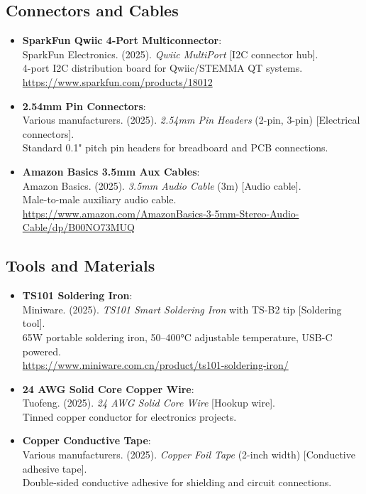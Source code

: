 \subsection*{Connectors and Cables}

\begin{itemize}[topsep=0pt, partopsep=0pt, parsep=0pt, itemsep=6pt]
	\item \textbf{SparkFun Qwiic 4-Port Multiconnector}: \\ 
	SparkFun Electronics. (2025). \textit{Qwiic MultiPort} [I2C connector hub].\\ 
	4-port I2C distribution board for Qwiic/STEMMA QT systems.\\
	\url{https://www.sparkfun.com/products/18012}
	
	\item \textbf{2.54mm Pin Connectors}: \\ 
	Various manufacturers. (2025). \textit{2.54mm Pin Headers} (2-pin, 3-pin) [Electrical connectors].\\ 
	Standard 0.1" pitch pin headers for breadboard and PCB connections.
	
	\item \textbf{Amazon Basics 3.5mm Aux Cables}: \\ 
	Amazon Basics. (2025). \textit{3.5mm Audio Cable} (3m) [Audio cable].\\ 
	Male-to-male auxiliary audio cable.\\
	\url{https://www.amazon.com/AmazonBasics-3-5mm-Stereo-Audio-Cable/dp/B00NO73MUQ}
\end{itemize}

\subsection*{Tools and Materials}

\begin{itemize}[topsep=0pt, partopsep=0pt, parsep=0pt, itemsep=6pt]
	\item \textbf{TS101 Soldering Iron}: \\ 
	Miniware. (2025). \textit{TS101 Smart Soldering Iron} with TS-B2 tip [Soldering tool].\\ 
	65W portable soldering iron, 50–400°C adjustable temperature, USB-C powered.\\
	\url{https://www.miniware.com.cn/product/ts101-soldering-iron/}
	
	\item \textbf{24 AWG Solid Core Copper Wire}: \\ 
	Tuofeng. (2025). \textit{24 AWG Solid Core Wire} [Hookup wire].\\ 
	Tinned copper conductor for electronics projects.
	
	\item \textbf{Copper Conductive Tape}: \\ 
	Various manufacturers. (2025). \textit{Copper Foil Tape} (2-inch width) [Conductive adhesive tape].\\ 
	Double-sided conductive adhesive for shielding and circuit connections.
\end{itemize}